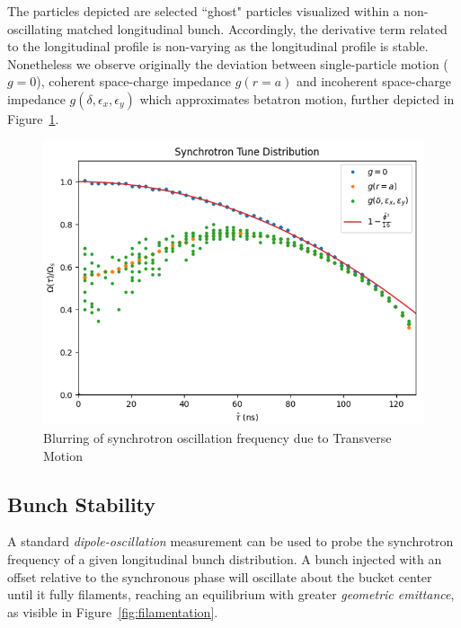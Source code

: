 The particles depicted are selected ``ghost" particles visualized within a non-oscillating matched longitudinal bunch. Accordingly, the derivative term related to the longitudinal profile is non-varying as the longitudinal profile is stable. Nonetheless we observe originally the deviation between single-particle motion ($g=0$), coherent space-charge impedance $g(r=a)$ and incoherent space-charge impedance $g(\delta, \epsilon_x, \epsilon_y)$ which approximates betatron motion, further depicted in Figure~\ref{fig:tune_dist_blur}.

\begin{figure}
    \centering
    \includegraphics{figs/tune_blurr/normalized_tune.png}
    \caption{Blurring of synchrotron oscillation frequency due to Transverse Motion}
    \label{fig:tune_dist_blur}
\end{figure}

\subsection{Bunch Stability}

A standard \textit{dipole-oscillation} measurement can be used to probe the synchrotron frequency of a given longitudinal bunch distribution. A bunch injected with an offset relative to the synchronous phase will oscillate about the bucket center until it fully filaments, reaching an equilibrium with greater \textit{geometric emittance}, as visible in Figure~\ref{fig:filamentation}.

